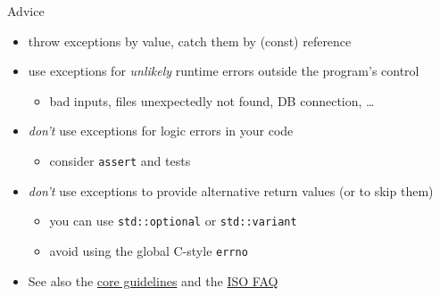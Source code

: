 \begin{frame}[fragile]
  \begin{block}{Advice}
    \begin{itemize}
      \item throw exceptions by value, catch them by (const) reference
      \item use exceptions for \textit{unlikely} runtime errors outside the program's control
      \begin{itemize}
        \item  bad inputs, files unexpectedly not found, DB connection, \ldots
      \end{itemize}
      \item \textit{don't} use exceptions for logic errors in your code
      \begin{itemize}
        \item consider \texttt{assert} and tests
      \end{itemize}
      \item \textit{don't} use exceptions to provide alternative return values (or to skip them)
      \begin{itemize}
        \item you can use \texttt{std::optional} or \texttt{std::variant}
        \item avoid using the global C-style \texttt{errno}
      \end{itemize}
      \item See also the \href{https://isocpp.github.io/CppCoreGuidelines/CppCoreGuidelines#S-errors}{\cpp core guidelines} and the \href{https://isocpp.org/wiki/faq/exceptions}{ISO \cpp FAQ}
    \end{itemize}
  \end{block}
\end{frame}


